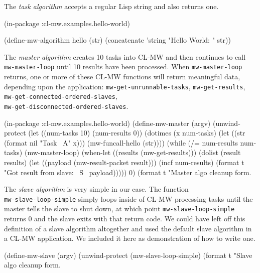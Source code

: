 \documentclass[titlepage,12pt]{book}
\newcommand{\xsmall}{\latexhtml{\small}{}}
\newcommand{\xnormalsize}{\latexhtml{\normalsize}{}}
\newcommand{\clmw}{\xsmall\textsc{CL-MW}\xnormalsize\xspace}
\newcommand{\sa}{\textit{slave algorithm}\xspace}
\newcommand{\ma}{\textit{master algorithm}\xspace}
\newcommand{\ta}{\textit{task algorithm}\xspace}
\newcommand{\func}[1]{\mbox{\texttt{#1}}\xspace}
\newcommand{\file}[1]{\texttt{#1}\xspace}
\newcommand{\bold}[1]{\textbf{#1}\xspace}
\begin{document}
The \ta accepts a regular Lisp string and also returns one.

\begin{lisp}[caption=\file{hello-world.lisp: \bold{Part 1 of 4}}]
(in-package :cl-mw.examples.hello-world)

(define-mw-algorithm hello (str)
  (concatenate 'string "Hello World: " str))
\end{lisp}

The \ma creates 10 tasks into \clmw and then continues
to call \func{mw-master-loop} until 10 results have been
processed.  When \func{mw-master-loop} returns, one or
more of these \clmw functions will return meaningful data,
depending upon the application: \func{mw-get-unrunnable-tasks},
\func{mw-get-results}, \func{mw-get-connected-ordered-slaves},\\
\func{mw-get-disconnected-ordered-slaves}.

\begin{lisp}[caption=\file{hello-world.lisp: \bold{Part 2 of 4}}]
(in-package :cl-mw.examples.hello-world)
(define-mw-master (argv)
    (unwind-protect
         (let ((num-tasks 10)
               (num-results 0))
           (dotimes (x num-tasks)
             (let ((str (format nil "Task ~A" x)))
               (mw-funcall-hello (str))))
           (while (/= num-results num-tasks)
             (mw-master-loop)
             (when-let ((results (mw-get-results)))
               (dolist (result results)
                 (let ((payload (mw-result-packet result)))
                   (incf num-results)
                   (format t "Got result from slave: ~S~%
                           payload)))))
           0)
      (format t "Master algo cleanup form.~%
\end{lisp}

The \sa is very simple in our case. The function\\
\func{mw-slave-loop-simple} simply loops inside of \clmw processing
tasks until the master tells the slave to shut down, at which point
\func{mw-slave-loop-simple} returns 0 and the slave exits with
that return code. We could have left off this definition of a slave
algorithm altogether and used the default slave algorithm in a \clmw
application. We included it here as demonstration of how to write one.

\begin{lisp}[caption=\file{hello-world.lisp: \bold{Part 3 of 4}}]
(define-mw-slave (argv)
  (unwind-protect
       (mw-slave-loop-simple)
    (format t "Slave algo cleanup form.~%
\end{lisp}
\end{document}
